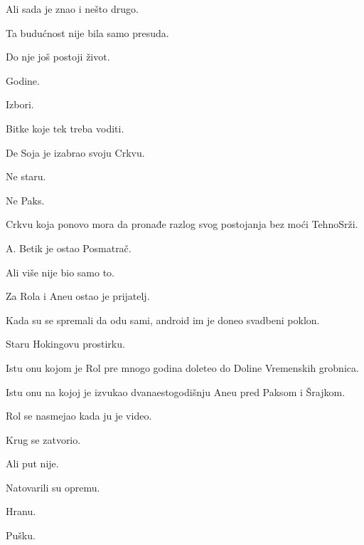 \bigskip

Ali sada je znao i nešto drugo.

\bigskip

Ta budućnost nije bila samo presuda.

\bigskip

Do nje još postoji život.

\bigskip

Godine.

Izbori.

Bitke koje tek treba voditi.

\bigskip

De Soja je izabrao svoju Crkvu.

\bigskip

Ne staru.

\bigskip

Ne Paks.

\bigskip

Crkvu koja ponovo mora da pronađe razlog svog postojanja bez moći TehnoSrži.

\bigskip

A. Betik je ostao Posmatrač.

\bigskip

Ali više nije bio samo to.

\bigskip

Za Rola i Aneu ostao je prijatelj.

\bigskip

Kada su se spremali da odu sami, android im je doneo svadbeni poklon.

\bigskip

Staru Hokingovu prostirku.

\bigskip

Istu onu kojom je Rol pre mnogo godina doleteo do Doline Vremenskih grobnica.

\bigskip

Istu onu na kojoj je izvukao dvanaestogodišnju Aneu pred Paksom i Šrajkom.

\bigskip

Rol se nasmejao kada ju je video.

\bigskip

Krug se zatvorio.

\bigskip

Ali put nije.

\bigskip

Natovarili su opremu.

Hranu.

Pušku.

